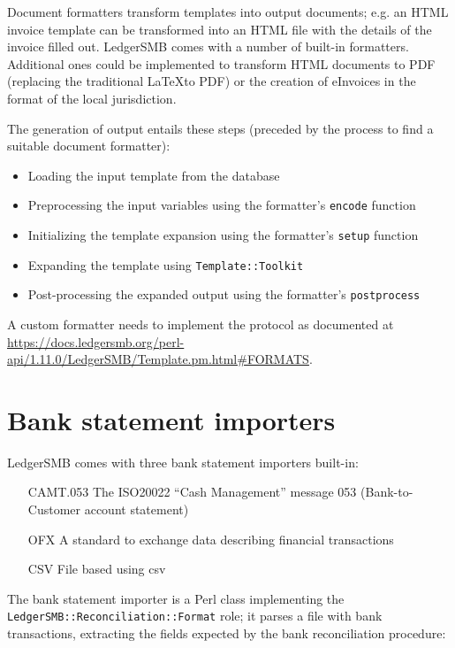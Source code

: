 Document formatters transform templates into output documents; e.g. an HTML invoice
template can be transformed into an HTML file with the details of the invoice filled
out.  LedgerSMB comes with a number of built-in formatters.  Additional ones could be
implemented to transform HTML documents to PDF (replacing the traditional \LaTeX to PDF)
or the creation of eInvoices in the format of the local jurisdiction.

The generation of output entails these steps (preceded by the process to find a
suitable document formatter):

\begin{itemize}
	\item Loading the input template from the database
	\item Preprocessing the input variables using the formatter's \texttt{encode}
		function
	\item Initializing the template expansion using the formatter's \texttt{setup} function
	\item Expanding the template using \texttt{Template::Toolkit}
	\item Post-processing the expanded output using the formatter's \texttt{postprocess}
\end{itemize}

A custom formatter needs to implement the protocol as documented at \url{https://docs.ledgersmb.org/perl-api/1.11.0/LedgerSMB/Template.pm.html#FORMATS}.

\section{Bank statement importers}
\label{sec-customization-bank-importers}

LedgerSMB comes with three bank statement importers built-in:

\begin{itemize}
	\item [CAMT.053] The \gls{ISO20022} ``Cash Management'' message 053
		(Bank-to-Customer account statement)
	\item [\gls{OFX}\index{OFX}] A standard to exchange data describing financial transactions
	\item [CSV]  File based using \gls{csv}
\end{itemize}

The bank statement importer is a Perl class implementing the
\texttt{LedgerSMB::Reconciliation::Format} role; it parses a file with bank
transactions, extracting the fields expected by the bank reconciliation procedure:

